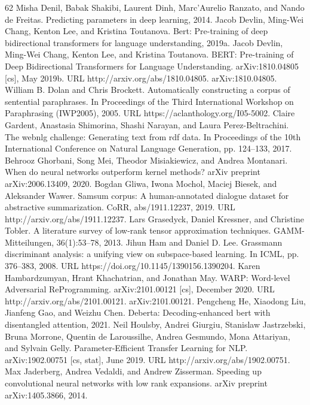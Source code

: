 \documentclass[conference]{IEEEtran}
\begin{document}
\begin{thebibliography}{62}
 Misha Denil, Babak Shakibi, Laurent Dinh, Marc’Aurelio Ranzato, and Nando de Freitas. Predicting parameters in deep learning, 2014.
 Jacob Devlin, Ming-Wei Chang, Kenton Lee, and Kristina Toutanova. Bert: Pre-training of deep bidirectional transformers for language understanding, 2019a.
 Jacob Devlin, Ming-Wei Chang, Kenton Lee, and Kristina Toutanova. BERT: Pre-training of Deep Bidirectional Transformers for Language Understanding. arXiv:1810.04805 [cs], May 2019b. URL http://arxiv.org/abs/1810.04805. arXiv:1810.04805.
 William B. Dolan and Chris Brockett. Automatically constructing a corpus of sentential paraphrases. In Proceedings of the Third International Workshop on Paraphrasing (IWP2005), 2005. URL https://aclanthology.org/I05-5002.
 Claire Gardent, Anastasia Shimorina, Shashi Narayan, and Laura Perez-Beltrachini. The webnlg challenge: Generating text from rdf data. In Proceedings of the 10th International Conference on Natural Language Generation, pp. 124–133, 2017.
 Behrooz Ghorbani, Song Mei, Theodor Misiakiewicz, and Andrea Montanari. When do neural networks outperform kernel methods? arXiv preprint arXiv:2006.13409, 2020.
 Bogdan Gliwa, Iwona Mochol, Maciej Biesek, and Aleksander Wawer. Samsum corpus: A human-annotated dialogue dataset for abstractive summarization. CoRR, abs/1911.12237, 2019. URL http://arxiv.org/abs/1911.12237.
 Lars Grasedyck, Daniel Kressner, and Christine Tobler. A literature survey of low-rank tensor approximation techniques. GAMM-Mitteilungen, 36(1):53–78, 2013.
 Jihun Ham and Daniel D. Lee. Grassmann discriminant analysis: a unifying view on subspace-based learning. In ICML, pp. 376–383, 2008. URL https://doi.org/10.1145/1390156.1390204.
 Karen Hambardzumyan, Hrant Khachatrian, and Jonathan May. WARP: Word-level Adversarial ReProgramming. arXiv:2101.00121 [cs], December 2020. URL http://arxiv.org/abs/2101.00121. arXiv:2101.00121.
 Pengcheng He, Xiaodong Liu, Jianfeng Gao, and Weizhu Chen. Deberta: Decoding-enhanced bert with disentangled attention, 2021.
 Neil Houlsby, Andrei Giurgiu, Stanislaw Jastrzebski, Bruna Morrone, Quentin de Laroussilhe, Andrea Gesmundo, Mona Attariyan, and Sylvain Gelly. Parameter-Efficient Transfer Learning for NLP. arXiv:1902.00751 [cs, stat], June 2019. URL http://arxiv.org/abs/1902.00751.
 Max Jaderberg, Andrea Vedaldi, and Andrew Zisserman. Speeding up convolutional neural networks with low rank expansions. arXiv preprint arXiv:1405.3866, 2014.

\end{thebibliography}
\end{document}
